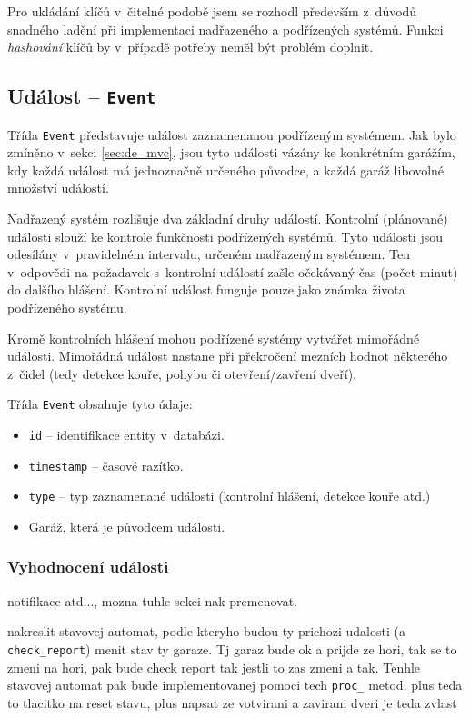Pro ukládání klíčů v~čitelné podobě jsem se rozhodl především z~důvodů snadného ladění při implementaci nadřazeného a podřízených systémů. Funkci \textit{hashování} klíčů by v~případě potřeby neměl být problém doplnit.

\subsection{Událost -- \texttt{Event}}
\label{sec:de_event}

Třída \texttt{Event} představuje událost zaznamenanou podřízeným systémem. Jak bylo zmíněno v~sekci \ref{sec:de_mvc}, jsou tyto události vázány ke konkrétním garážím, kdy každá událost má jednoznačně určeného původce, a každá garáž libovolné množství událostí.

Nadřazený systém rozlišuje dva základní druhy událostí. Kontrolní (plánované) události slouží ke kontrole funkčnosti podřízených systémů. Tyto události jsou odesílány v~pravidelném intervalu, určeném nadřazeným systémem. Ten v~odpovědi na požadavek s~kontrolní událostí zašle očekávaný čas (počet minut) do dalšího hlášení. Kontrolní událost funguje pouze jako známka života podřízeného systému.

Kromě kontrolních hlášení mohou podřízené systémy vytvářet mimořádné události. Mimořádná událost nastane při překročení mezních hodnot některého z~čidel (tedy detekce kouře, pohybu či otevření/zavření dveří).

Třída \texttt{Event} obsahuje tyto údaje:

\begin{itemize}
    \item \texttt{id} -- identifikace entity v~databázi.
    \item \texttt{timestamp} -- časové razítko.
    \item \texttt{type} -- typ zaznamenané události (kontrolní hlášení, detekce kouře atd.)
    \item Garáž, která je původcem události.
\end{itemize}

\subsubsection{Vyhodnocení události}

notifikace atd..., mozna tuhle sekci nak premenovat.

nakreslit stavovej automat, podle kteryho budou ty prichozi udalosti (a \texttt{check\_report}) menit stav ty garaze. Tj garaz bude ok a prijde ze hori, tak se to zmeni na hori, pak bude check report tak jestli to zas zmeni a tak. Tenhle stavovej automat pak bude implementovanej pomoci tech \texttt{proc\_} metod. plus teda to tlacitko na reset stavu, plus napsat ze votvirani a zavirani dveri je teda zvlast

